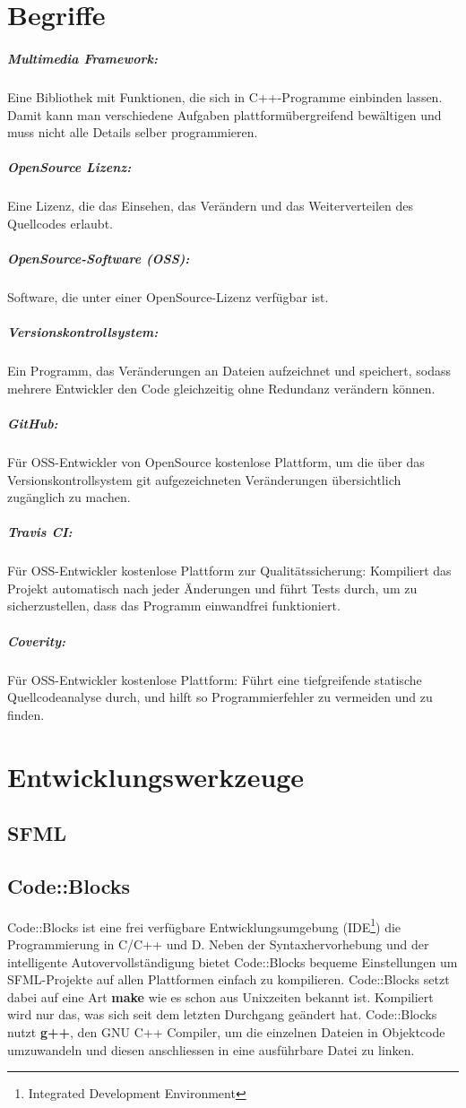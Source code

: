 \documentclass[12pt,a4paper]{scrartcl}
\begin{document}
\newpage
\section{Begriffe}
\subparagraph{Multimedia Framework:}
Eine Bibliothek mit Funktionen, die sich in C++-Programme einbinden lassen. Damit kann man verschiedene Aufgaben plattformübergreifend bewältigen und muss nicht alle Details selber programmieren.

\subparagraph{OpenSource Lizenz:}

Eine Lizenz, die das Einsehen, das Verändern und das Weiterverteilen des Quellcodes erlaubt.

\subparagraph{OpenSource-Software (OSS):}
Software, die unter einer OpenSource-Lizenz verfügbar ist.

\subparagraph{Versionskontrollsystem:}
Ein Programm, das Veränderungen an Dateien aufzeichnet und speichert, sodass mehrere Entwickler den Code gleichzeitig ohne Redundanz verändern können.

\subparagraph{GitHub:}
Für OSS-Entwickler von OpenSource kostenlose Plattform, um die über das Versionskontrollsystem git aufgezeichneten Veränderungen übersichtlich zugänglich zu machen.

\subparagraph{Travis CI:}
Für OSS-Entwickler kostenlose Plattform zur Qualitätssicherung: Kompiliert das Projekt automatisch nach jeder Änderungen und führt Tests durch, um zu sicherzustellen, dass das Programm einwandfrei funktioniert.

\subparagraph{Coverity:}
Für OSS-Entwickler kostenlose Plattform: Führt eine tiefgreifende statische Quellcodeanalyse durch, und hilft so Programmierfehler zu vermeiden und zu finden.

\section{Entwicklungswerkzeuge}
\subsection{SFML}

\subsection{Code::Blocks}
Code::Blocks ist eine frei verfügbare Entwicklungsumgebung (IDE\footnote{Integrated Development Environment}) die Programmierung in C/C++ und D.
Neben der Syntaxhervorhebung und der intelligente Autovervollständigung bietet Code::Blocks bequeme Einstellungen um SFML-Projekte auf allen Plattformen
einfach zu kompilieren. Code::Blocks setzt dabei auf eine Art \textbf{make} wie es schon aus Unixzeiten bekannt ist. Kompiliert wird nur das, was sich
seit dem letzten Durchgang geändert hat. Code::Blocks nutzt \textbf{g++}, den GNU C++ Compiler, um die einzelnen Dateien in Objektcode umzuwandeln und diesen
anschliessen in eine ausführbare Datei zu linken.
\end{document}
